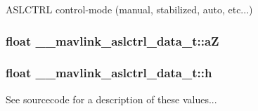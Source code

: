 A\+S\+L\+C\+T\+R\+L control-\/mode (manual, stabilized, auto, etc...) 

\hypertarget{struct____mavlink__aslctrl__data__t_a31100970ea83829b22ac9674c76deffd}{
\subsubsection[{a\+Z}]{\setlength{\rightskip}{0pt plus 5cm}float \+\_\+\+\_\+mavlink\+\_\+aslctrl\+\_\+data\+\_\+t\+::a\+Z}}\label{struct____mavlink__aslctrl__data__t_a31100970ea83829b22ac9674c76deffd}
\hypertarget{struct____mavlink__aslctrl__data__t_a957135ead069638d0b7e2feab93624f1}{
\subsubsection[{h}]{\setlength{\rightskip}{0pt plus 5cm}float \+\_\+\+\_\+mavlink\+\_\+aslctrl\+\_\+data\+\_\+t\+::h}}\label{struct____mavlink__aslctrl__data__t_a957135ead069638d0b7e2feab93624f1}


See sourcecode for a description of these values... 

